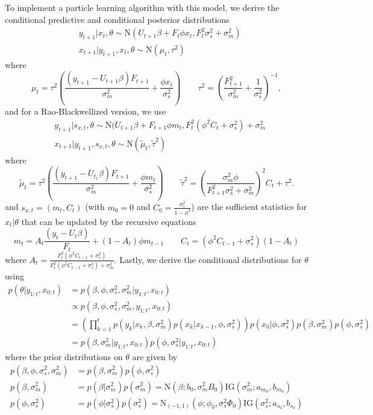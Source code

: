 \documentclass{article}
\begin{document}
To implement a particle learning algorithm with this model, we derive the conditional predictive and conditional posterior distributions
\begin{align*}
&y_{t+1}|x_t,\theta \sim \mbox{N}(U_{t+1}\beta + F_t\phi x_t, F_t^2\sigma^2_s + \sigma^2_m) \\
&x_{t+1}|y_{t+1},x_t,\theta \sim \mbox{N}(\mu_t,\tau^2)
\end{align*}
where \[\mu_t = \tau^2\left(\frac{(y_{t+1}-U_{t+1}\beta)F_{t+1}}{\sigma^2_m} + \frac{\phi x_t}{\sigma^2_s}\right) \qquad \tau^2 = \left(\frac{F_{t+1}^2}{\sigma^2_m} + \frac{1}{\sigma^2_s}\right)^{-1},\] and for a Rao-Blackwellized version, we use
\begin{align*}
&y_{t+1}|s_{x,t},\theta \sim \mbox{N}(U_{t+1}\beta + F_{t+1}\phi m_t, F_t^2(\phi^2 C_t + \sigma^2_s) + \sigma^2_m \\
&x_{t+1}|y_{t+1},s_{x,t},\theta \sim \mbox{N}(\tilde{\mu}_t,\tilde{\tau}^2)
\end{align*}
where \[\tilde{\mu}_t = \tau^2\left(\frac{(y_{t+1}-U_{t_1}\beta)F_{t+1}}{\sigma^2_m} + \frac{\phi m_t}{\sigma^2_s}\right) \qquad \tilde{\tau}^2 = \left(\frac{\sigma^2_m\phi}{F_{t+1}^2\sigma^2_s + \sigma^2_m}\right)^2C_t + \tau^2.\]
and $s_{x,t} = (m_t,C_t)$ (with $m_0 = 0$ and $C_0 = \frac{\sigma^2_s}{1-\phi^2}$) are the sufficient statistics for $x_t|\theta$ that can be updated by the recursive equations \[m_t = A_t\frac{(y_t - U_t\beta)}{F_t} + (1 - A_t)\phi m_{t-1} \qquad C_t = (\phi^2C_{t-1} + \sigma^2_s)(1 - A_t)\]
where $A_t = \frac{F_t^2(\phi^2C_{t-1} + \sigma^2_s)}{F_t^2(\phi^2C_{t-1} + \sigma^2_s) + \sigma^2_m}$. Lastly, we derive the conditional distributions for $\theta$ using
\begin{align*}
p(\theta|y_{1:t},x_{0:t}) &= p(\beta,\phi,\sigma^2_s,\sigma^2_m|y_{1:t},x_{0:t}) \\
&\propto p(\beta,\phi,\sigma^2_s,\sigma^2_m,y_{1:t},x_{0:t}) \\
&= \left(\prod_{k=1}^t p(y_k|x_k,\beta,\sigma^2_m)p(x_k|x_{k-1},\phi,\sigma^2_s)\right)p(x_0|\phi,\sigma^2_s)p(\beta,\sigma^2_m)p(\phi,\sigma^2_s) \\
&= p(\beta,\sigma^2_m|y_{1:t},x_{0:t})p(\phi,\sigma^2_s|y_{1:t},x_{0:t})
\end{align*}
where the prior distributions on $\theta$ are given by
\begin{align*}
p(\beta,\phi,\sigma^2_s,\sigma^2_m) &= p(\beta,\sigma^2_m)p(\phi,\sigma^2_s) \\
p(\beta,\sigma^2_m) &= p(\beta|\sigma^2_m)p(\sigma^2_m) = \mbox{N}(\beta; b_0, \sigma^2_m B_0)\mbox{IG}(\sigma^2_m;a_{m_0},b_{m_0}) \\
p(\phi,\sigma^2_s) &= p(\phi|\sigma^2_s)p(\sigma^2_s) = \mbox{N}_{(-1,1)}(\phi; \phi_0, \sigma^2_s \Phi_0)\mbox{IG}(\sigma^2_s;a_{s_0},b_{s_0})
\end{align*}
\end{document}
